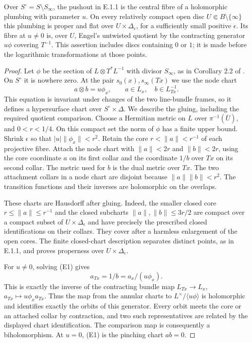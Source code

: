 \begin{proposition}[E.1.2; Proved]\label{st:E.1.2}
Over $S^\circ=S\setminus S_\infty$, the pushout in E.1.1 is the central
fibre of a holomorphic plumbing with parameter $u$. On every relatively
compact open disc $U\Subset B\setminus\{\infty\}$ this plumbing is
proper and flat over $U\times\Delta_\epsilon$, for a sufficiently small
positive $\epsilon$. Its fibre at $u\ne0$ is, over $U$, Engel's untwisted
quotient by the contracting generator $u\phi$ covering $T^{-1}$.
This assertion includes discs containing $0$ or $1$; it is made before
the logarithmic transformations at those points.
\end{proposition}

\begin{proof}
Let $\phi$ be the section of $L\otimes T^*L^{-1}$ with divisor
$S_\infty$, as in Corollary 2.2 of \cite{E26}. On $S^\circ$ it is
nowhere zero. At the pair $s_0(x),s_\infty(Tx)$ we use the node chart
\[
       a\otimes b=u\phi_x,
       \qquad a\in L_x,\quad b\in L^{-1}_{Tx}.                 \tag{E1}
\]
This equation is invariant under changes of the two line-bundle
frames, so it defines a hypersurface chart over $S^\circ\times\Delta$.
We describe the gluing, including the required quotient comparison.
Choose a Hermitian metric on $L$ over $\pi^{-1}(\overline U)$, and
$0<r<1/4$. On this compact set the norm of $\phi$ has a finite upper
bound. Shrink $\epsilon$ so that $|u|\|\phi_x\|<r^2$.
Retain the core $r<\|a\|<r^{-1}$ of each projective fibre. Attach the
node chart with $\|a\|<2r$ and $\|b\|<2r$, using the core coordinate
$a$ on its first collar and the coordinate $1/b$ over $Tx$ on its
second collar. The metric used for $b$ is the dual metric over $Tx$.
The two attachment collars in a node chart are disjoint because
$\|a\|\|b\|<r^2$. The transition functions and their inverses are
holomorphic on the overlaps.

These charts are Hausdorff after gluing. Indeed, the smaller closed
core $r\leq\|a\|\leq r^{-1}$ and the closed subcharts
$\|a\|,\|b\|\leq 3r/2$ are compact over a compact subset of
$U\times\Delta_\epsilon$ and have precisely the prescribed closed
identifications on their collars. They cover after a harmless
enlargement of the open cores. The finite closed-chart description
separates distinct points, as in E.1.1, and proves properness over
$U\times\Delta_\epsilon$.

For $u\ne0$, solving (E1) gives
\[
              a_{Tx}=1/b=a_x/(u\phi_x).
\]
This is exactly the inverse of the contracting bundle map
$L_{Tx}\to L_x$, $a_{Tx}\mapsto u\phi_xa_{Tx}$. Thus the map from
the annular charts to $L^\times/\langle u\phi\rangle$ is holomorphic
and identifies exactly the orbits of this generator. Every orbit
meets the core or an attached collar by contraction, and two such
representatives are related by the displayed chart identification.
The comparison map is consequently a biholomorphism. At $u=0$,
(E1) is the pinching chart $ab=0$.


\end{proof}
